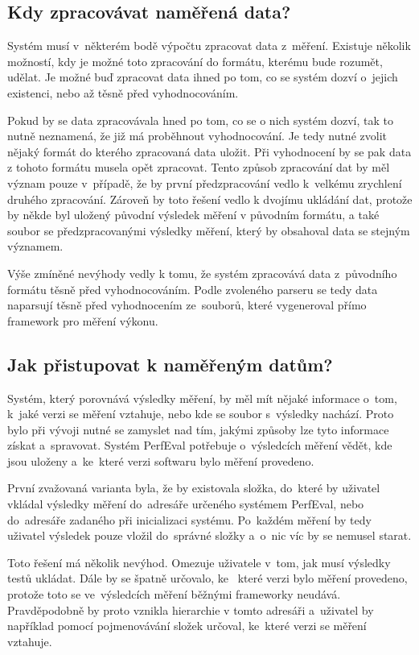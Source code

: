 \subsection{Kdy zpracovávat naměřená data?}

Systém musí v~některém bodě výpočtu zpracovat data z~měření. Existuje několik možností, kdy
je možné toto zpracování do formátu, kterému bude rozumět, udělat. Je možné buď zpracovat
data ihned po tom, co se systém dozví o~jejich existenci, nebo až těsně před vyhodnocováním.

Pokud by se data zpracovávala hned po tom, co se o nich systém dozví, tak to nutně neznamená,
že již má proběhnout vyhodnocování. Je tedy nutné zvolit nějaký formát do kterého zpracovaná data
uložit. Při vyhodnocení by se pak data z tohoto formátu musela opět zpracovat. Tento způsob
zpracování dat by měl význam pouze v~případě, že by první předzpracování vedlo k~velkému
zrychlení druhého zpracování. Zároveň by toto řešení vedlo k dvojímu ukládání dat, protože
by někde byl uložený původní výsledek měření v původním formátu, a také soubor se předzpracovanými
výsledky měření, který by obsahoval data se stejným významem.

Výše zmíněné nevýhody vedly k tomu, že systém zpracovává data z~původního formátu těsně před
vyhodnocováním. Podle zvoleného parseru se tedy data naparsují těsně před vyhodnocením ze~souborů,
které vygeneroval přímo framework pro měření výkonu.

\subsection{Jak přistupovat k naměřeným datům?}

Systém, který porovnává výsledky měření, by měl mít nějaké informace o~tom, k~jaké verzi se měření vztahuje, nebo kde
se soubor s~výsledky nachází. Proto bylo při vývoji nutné se zamyslet nad tím, jakými způsoby lze tyto informace získat a~spravovat.
Systém PerfEval potřebuje o~výsledcích měření vědět, kde jsou uloženy a~ke~které verzi softwaru bylo měření provedeno.

První zvažovaná varianta byla, že by existovala složka, do~které by uživatel vkládal výsledky měření do~adresáře určeného
systémem PerfEval, nebo do~adresáře zadaného při inicializaci systému. Po~každém měření by tedy uživatel výsledek pouze
vložil do~správné složky a~o~nic víc by se nemusel starat.

Toto řešení má několik nevýhod. Omezuje uživatele v~tom, jak musí výsledky testů ukládat. Dále by se špatně určovalo, ke~
které verzi bylo měření provedeno, protože toto se ve~výsledcích měření běžnými frameworky neudává. Pravděpodobně by proto
vznikla hierarchie v tomto adresáři a~uživatel by například pomocí pojmenovávání složek určoval, ke~které verzi se měření vztahuje.

